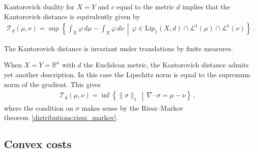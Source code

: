 
    \begin{theorem}
        Kantorovich duality for $X=Y$ and $c$ equal to the metric $d$ implies that the Kantorovich distance is equivalently given by
        \begin{gather}
            \mathcal{T}_d(\mu,\nu) = \sup\left\{\int_X\varphi\,d\mu-\int_X\varphi\,d\nu\,\middle\vert\,\varphi\in\mathrm{Lip}_1(X,d)\cap\mathcal{L}^1(\mu)\cap\mathcal{L}^1(\nu)\right\}\,.
        \end{gather}
    \end{theorem}

    \begin{property}
        The Kantorovich distance is invariant under translations by finite measures.
    \end{property}

    \begin{property}
        When $X=Y=\mathbb{R}^n$ with $d$ the Euclidean metric, the Kantorovich distance admits yet another description. In this case the Lipschitz norm is equal to the supremum norm of the gradient. This gives
        \begin{gather}
            \mathcal{T}_d(\mu,\nu) = \inf\left\{\|\sigma\|_1\,\middle\vert\,\nabla\cdot\sigma=\mu-\nu\right\}\,,
        \end{gather}
        where the condition on $\sigma$ makes sense by the Riesz--Markov theorem~\ref{distributions:riesz_markov}.
    \end{property}

\subsection{Convex costs}

